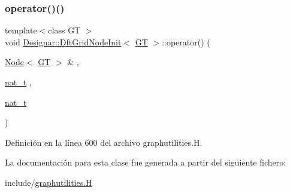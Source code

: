 \subsubsection{\texorpdfstring{operator()()}{operator()()}}
{\footnotesize\ttfamily template$<$class GT $>$ \\
void \hyperlink{class_designar_1_1_dft_grid_node_init}{Designar\+::\+Dft\+Grid\+Node\+Init}$<$ \hyperlink{demo-buildgraph_8_c_a3001c40d2c31ca87ed96cd7d1334a55e}{GT} $>$\+::operator() (\begin{DoxyParamCaption}\item[{\hyperlink{namespace_designar_a5af326c65aa2bd26b26c410f2030d09e}{Node}$<$ \hyperlink{demo-buildgraph_8_c_a3001c40d2c31ca87ed96cd7d1334a55e}{GT} $>$ \&}]{,  }\item[{\hyperlink{namespace_designar_aa72662848b9f4815e7bf31a7cf3e33d1}{nat\+\_\+t}}]{,  }\item[{\hyperlink{namespace_designar_aa72662848b9f4815e7bf31a7cf3e33d1}{nat\+\_\+t}}]{ }\end{DoxyParamCaption})\hspace{0.3cm}{\ttfamily [inline]}}



Definición en la línea 600 del archivo graphutilities.\+H.



La documentación para esta clase fue generada a partir del siguiente fichero\+:\begin{DoxyCompactItemize}
\item 
include/\hyperlink{graphutilities_8_h}{graphutilities.\+H}\end{DoxyCompactItemize}
